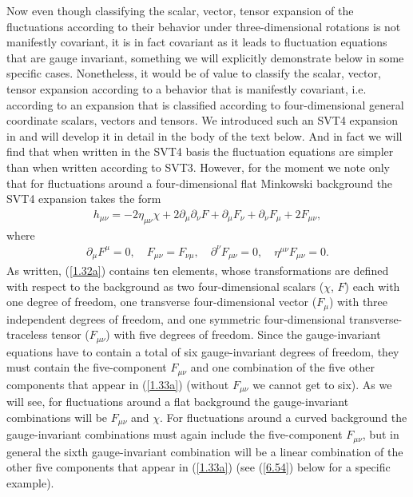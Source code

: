 \documentclass[aps,onecolumn,10pt]{revtex4}
\numberwithin{equation}{section}
\numberwithin{equation}{section}
\begin{document}
Now even though classifying the scalar, vector, tensor expansion of the fluctuations according to their behavior under three-dimensional rotations is not manifestly covariant, it is in fact covariant as it leads to fluctuation equations that are gauge invariant, something we will explicitly demonstrate below in some specific cases. Nonetheless, it would be of value to classify the scalar, vector, tensor expansion according to a behavior that is manifestly covariant, i.e. according to an expansion that is classified according to four-dimensional general coordinate scalars, vectors and tensors. We introduced such an SVT4 expansion in \cite{Amarasinghe2018} and will develop it in detail in the body of the text below. And in fact we will find that when written in the SVT4 basis the fluctuation equations are simpler than when written according to SVT3. However, for the moment we note only that for fluctuations around a four-dimensional flat Minkowski background the SVT4 expansion takes the form 
%
\begin{eqnarray}
h_{\mu\nu}=-2\eta_{\mu\nu}\chi+2\partial_{\mu}\partial_{\nu}F
+ \partial_{\mu}F_{\nu}+\partial_{\nu}F_{\mu}+2F_{\mu\nu},
\label{1.32a}
\end{eqnarray}
%
where 
%
\begin{eqnarray}
\partial_{\mu} F^{\mu}= 0, \quad F_{\mu\nu}=F_{\nu\mu},\quad \partial^{\nu}F_{\mu\nu} = 0, \quad \eta^{\mu\nu}F_{\mu\nu} = 0.
\label{1.33a}
\end{eqnarray}
%
As written, (\ref{1.32a}) contains ten elements, whose transformations are defined with respect to the background as two four-dimensional scalars ($\chi$, $F$) each with one degree of freedom, one transverse four-dimensional vector  ($F_{\mu}$) with three independent degrees of freedom, and one symmetric four-dimensional transverse-traceless tensor ($F_{\mu\nu}$) with five degrees of freedom. Since the gauge-invariant equations have to  contain a total of six gauge-invariant degrees of freedom, they must contain the five-component $F_{\mu\nu}$ and one combination of the five other components that appear in (\ref{1.33a}) (without $F_{\mu\nu}$ we cannot get to six). As we will see, for fluctuations around a flat background the gauge-invariant combinations will be $F_{\mu\nu}$ and $\chi$. For fluctuations around a curved background the gauge-invariant combinations must again include the five-component $F_{\mu\nu}$, but in general the sixth gauge-invariant combination will be a linear combination of the other five components that appear in (\ref{1.33a}) (see (\ref{6.54}) below for a specific example).
\end{document}
